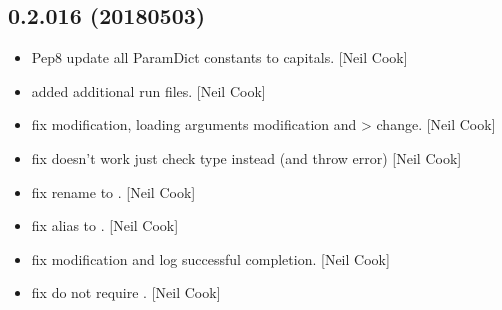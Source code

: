 \documentclass[a4paper,10pt,english]{report}
\begin{document}
\subsection{0.2.016 (2018\sphinxhyphen{}05\sphinxhyphen{}03)}
\label{\detokenize{misc/changelog:id463}}\begin{itemize}
\item {} 
Pep8 update all ParamDict constants to capitals. {[}Neil Cook{]}

\item {} 
 \sphinxhyphen{} added additional run files. {[}Neil Cook{]}

\item {} 
 fix \sphinxhyphen{}  modification, loading arguments modification
and  \textendash{}\textgreater{}  change. {[}Neil Cook{]}

\item {} 
 fix \sphinxhyphen{}  doesn’t work \sphinxhyphen{} just check type instead (and
throw error) {[}Neil Cook{]}

\item {} 
 fix \sphinxhyphen{} rename  to . {[}Neil Cook{]}

\item {} 
 fix \sphinxhyphen{} alias to . {[}Neil Cook{]}

\item {} 
 fix \sphinxhyphen{}  modification and log successful
completion. {[}Neil Cook{]}

\item {} 
 fix \sphinxhyphen{} do not require . {[}Neil Cook{]}

\end{itemize}
\end{document}

